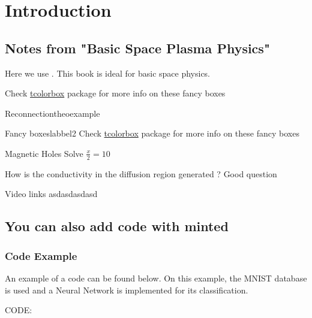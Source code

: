 \chapter{Introduction}
\section{Notes from "Basic Space Plasma Physics"}

Here we use \cite{baumjohann2012basic}.  This book is ideal for basic space physics.
 \begin{note}
Check \href{https://www.ctan.org/pkg/tcolorbox}{tcolorbox} package for more info on these fancy boxes
 \end{note}

  
\begin{definition}{Reconnection}{theoexample}
\end{definition}

\begin{exercise}{Fancy boxes}{labbel2}
Check \href{https://www.ctan.org/pkg/tcolorbox}{tcolorbox} package for more info on these fancy boxes
\end{exercise}

\begin{exercise}{Magnetic Holes}
Solve $\frac{x}{2}=10$
\end{exercise}

\begin{question}{How is the conductivity in the diffusion region generated ? }
Good question
\end{question}

\begin{sources}{Video links}
asdasdasdasd
\end{sources}

\section{You can also add code with minted}
\subsection*{Code Example}
An example of a code can be found below. On this example, the MNIST database is used and a Neural Network is implemented for its classification.


\newpage
CODE:

